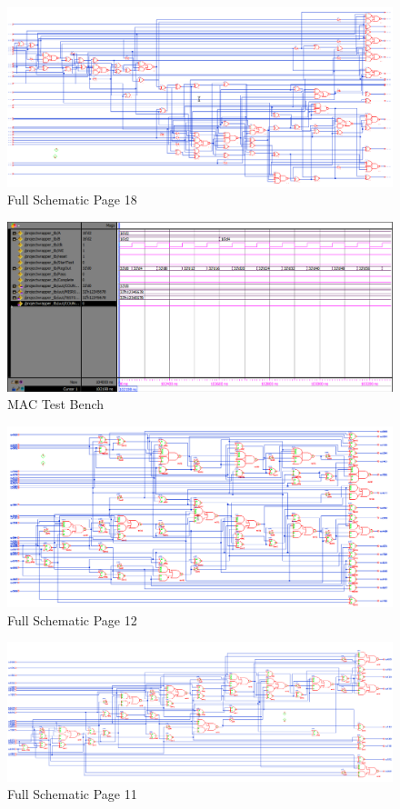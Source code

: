 \documentclass[11pt]{article}
\begin{document}
	
	\begin{figure}[H] 
		\centering 
		\includegraphics[width=0.7\linewidth]{"Pictures/Full Schematic Page 18"}
		\caption{Full Schematic Page 18} 
		\label{fig:Full-Schematic-Page-18} 
	\end{figure}
	
	
	\begin{figure}[H] 
		\centering 
		\includegraphics[width=0.7\linewidth]{"Pictures/MAC-Test-Bench"}
		\caption{MAC Test Bench} 
		\label{fig:MAC-Test-Bench} 
	\end{figure}
	
	
	\begin{figure}[H] 
		\centering 
		\includegraphics[width=0.7\linewidth]{"Pictures/Full Schematic Page 12"}
		\caption{Full Schematic Page 12} 
		\label{fig:Full-Schematic-Page-12} 
	\end{figure}
	
	
	\begin{figure}[H] 
		\centering 
		\includegraphics[width=0.7\linewidth]{"Pictures/Full Schematic Page 11"}
		\caption{Full Schematic Page 11} 
		\label{fig:Full-Schematic-Page-11} 
	\end{figure}
	
\end{document}
